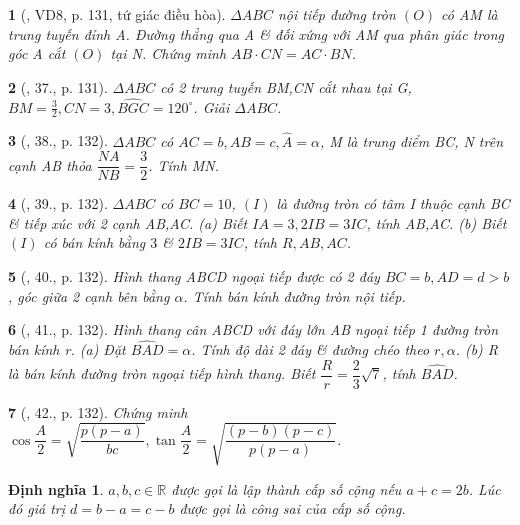 \documentclass{article}
\newtheorem{baitoan}{}
\newtheorem{dinhnghia}{Định nghĩa}
\begin{document}
\begin{baitoan}[\cite{TLCT_hinh_hoc_10}, VD8, p. 131, tứ giác điều hòa]
	$\Delta ABC$ nội tiếp đường tròn $(O)$ có AM là trung tuyến đỉnh A. Đường thẳng qua A \& đối xứng với AM qua phân giác trong góc A cắt $(O)$ tại N. Chứng minh $AB\cdot CN = AC\cdot BN$.
\end{baitoan}

\begin{baitoan}[\cite{TLCT_hinh_hoc_10}, 37., p. 131]
	$\Delta ABC$ có 2 trung tuyến BM,CN cắt nhau tại G, $BM = \frac{3}{2},CN = 3,\widehat{BGC} = 120^\circ$. Giải $\Delta ABC$.
\end{baitoan}

\begin{baitoan}[\cite{TLCT_hinh_hoc_10}, 38., p. 132]
	$\Delta ABC$ có $AC = b,AB = c,\widehat{A} = \alpha$, M là trung điểm BC, N trên cạnh AB thỏa $\dfrac{NA}{NB} = \dfrac{3}{2}$. Tính MN.
\end{baitoan}

\begin{baitoan}[\cite{TLCT_hinh_hoc_10}, 39., p. 132]
	$\Delta ABC$ có $BC = 10$, $(I)$ là đường tròn có tâm I thuộc cạnh BC \& tiếp xúc với 2 cạnh AB,AC. (a) Biết $IA = 3,2IB = 3IC$, tính AB,AC. (b) Biết $(I)$ có bán kính bằng $3$ \& $2IB = 3IC$, tính $R,AB,AC$.
\end{baitoan}

\begin{baitoan}[\cite{TLCT_hinh_hoc_10}, 40., p. 132]
	Hình thang ABCD ngoại tiếp được có 2 đáy $BC = b,AD = d > b$, góc giữa 2 cạnh bên bằng $\alpha$. Tính bán kính đường tròn nội tiếp.
\end{baitoan}

\begin{baitoan}[\cite{TLCT_hinh_hoc_10}, 41., p. 132]
	Hình thang cân ABCD với đáy lớn AB ngoại tiếp 1 đường tròn bán kính r. (a) Đặt $\widehat{BAD} = \alpha$. Tính độ dài 2 đáy \& đường chéo theo $r,\alpha$. (b) R là bán kính đường tròn ngoại tiếp hình thang. Biết $\dfrac{R}{r} = \dfrac{2}{3}\sqrt{7}$, tính $\widehat{BAD}$.
\end{baitoan}

\begin{baitoan}[\cite{TLCT_hinh_hoc_10}, 42., p. 132]
	Chứng minh $\cos\dfrac{A}{2} = \sqrt{\dfrac{p(p - a)}{bc}},\tan\dfrac{A}{2} = \sqrt{\dfrac{(p - b)(p - c)}{p(p - a)}}$.
\end{baitoan}

\begin{dinhnghia}
	$a,b,c\in\mathbb{R}$ được gọi là lập thành {\rm cấp số cộng} nếu $a + c = 2b$. Lúc đó giá trị $d = b - a = c - b$ được gọi là {\rm công sai} của cấp số cộng.
\end{dinhnghia}
\end{document}
